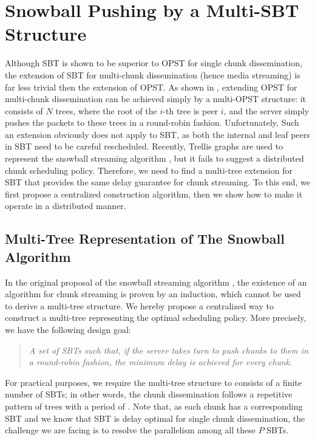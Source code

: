 \documentclass[conference]{IEEEtran}
\begin{document}
\section{Snowball Pushing by a Multi-SBT Structure} \label{sec:snap}
Although SBT is shown to be superior to OPST for single chunk dissemination, the extension of SBT for multi-chunk dissemination (hence media streaming) is far less trivial then the extension of OPST. As shown in \cite{LiuSJRC-SIGMETRICS08}, extending OPST for multi-chunk dissemination can be achieved simply by a multi-OPST structure: it consists of $N$ trees, where the root of the $i$-th tree is peer $i$, and the server simply pushes the packets to these trees in a round-robin fashion. Unfortunately, Such an extension obviously does not apply to SBT, as both the internal and leaf peers in SBT need to be careful rescheduled. Recently, Trellis graphs are used to represent the snowball streaming algorithm \cite{FengLL-INFOCOM09}, but it fails to suggest a distributed chunk scheduling policy. Therefore, we need to find a multi-tree extension for SBT that provides the same delay guarantee for chunk streaming. To this end, we first propose a centralized construction algorithm, then we show how to make it operate in a distributed manner.

\subsection{Multi-Tree Representation of The Snowball Algorithm}
In the original proposal of the snowball streaming algorithm \cite{Liu-MM07}, the existence of an algorithm for chunk streaming is proven by an induction, which cannot be used to derive a multi-tree structure. We hereby propose a centralized way to construct a multi-tree representing the optimal scheduling policy. More precisely, we have the following design goal:
\begin{quote} \textit{A set of SBTs such that, if the server takes turn to push chunks to them in a round-robin fashion, the minimum delay is achieved for every chunk.}
  \end{quote}
For practical purposes, we require the multi-tree structure to consists of a finite number of SBTs; in other words, the chunk dissemination follows a repetitive pattern of trees with a period of . Note that, as each chunk has a corresponding SBT and we know that SBT is delay optimal for single chunk dissemination, the challenge we are facing is to resolve the parallelism among all these $P$ SBTs.
\end{document}
